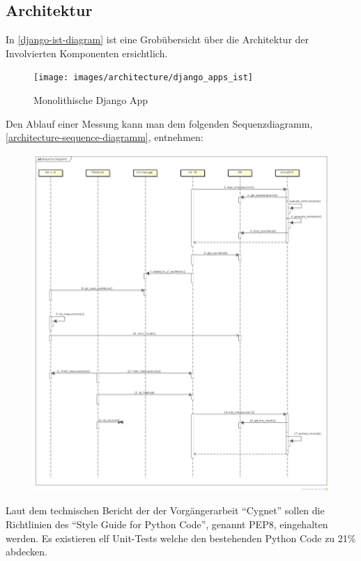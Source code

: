 \subsection{Architektur}
In \autoref{django-ist-diagram} ist eine Grobübersicht über die Architektur der
Involvierten Komponenten ersichtlich.

\begin{figure}[H]
	\centering
	\texttt{[image: images/architecture/django\_apps\_ist]}
    \caption{Monolithische Django App}
    \label{django-ist-diagram}
\end{figure}

Den Ablauf einer Messung kann man dem folgenden Sequenzdiagramm,
\autoref{architecture-sequence-diagramm}, entnehmen:
\begin{figure}[H]
	\centering
	\includegraphics[width=\textwidth]{./images/architecture/architecture_sequence_diagramm-2014-03-12}
	\caption{}
	\label{architecture-sequence-diagramm}
\end{figure}

Laut dem technischen Bericht der der Vorgängerarbeit
\enquote{Cygnet}\cite{cygnet:2013} sollen die Richtlinien des \enquote{Style
Guide for Python Code}\cite{PEP8:2001}, genannt PEP8, eingehalten werden. Es
existieren elf Unit-Tests welche den bestehenden Python Code zu 21\% abdecken.\\


